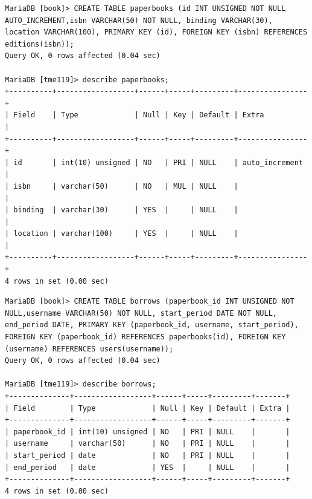 \documentclass{assignment}
\begin{document}
\begin{verbatim}
MariaDB [book]> CREATE TABLE paperbooks (id INT UNSIGNED NOT NULL AUTO_INCREMENT,isbn VARCHAR(50) NOT NULL, binding VARCHAR(30), location VARCHAR(100), PRIMARY KEY (id), FOREIGN KEY (isbn) REFERENCES editions(isbn));
Query OK, 0 rows affected (0.04 sec)

MariaDB [tme119]> describe paperbooks;
+----------+------------------+------+-----+---------+----------------+
| Field    | Type             | Null | Key | Default | Extra          |
+----------+------------------+------+-----+---------+----------------+
| id       | int(10) unsigned | NO   | PRI | NULL    | auto_increment |
| isbn     | varchar(50)      | NO   | MUL | NULL    |                |
| binding  | varchar(30)      | YES  |     | NULL    |                |
| location | varchar(100)     | YES  |     | NULL    |                |
+----------+------------------+------+-----+---------+----------------+
4 rows in set (0.00 sec)
\end{verbatim}

\begin{verbatim}
MariaDB [book]> CREATE TABLE borrows (paperbook_id INT UNSIGNED NOT NULL,username VARCHAR(50) NOT NULL, start_period DATE NOT NULL, end_period DATE, PRIMARY KEY (paperbook_id, username, start_period), FOREIGN KEY (paperbook_id) REFERENCES paperbooks(id), FOREIGN KEY (username) REFERENCES users(username));
Query OK, 0 rows affected (0.04 sec)

MariaDB [tme119]> describe borrows;
+--------------+------------------+------+-----+---------+-------+
| Field        | Type             | Null | Key | Default | Extra |
+--------------+------------------+------+-----+---------+-------+
| paperbook_id | int(10) unsigned | NO   | PRI | NULL    |       |
| username     | varchar(50)      | NO   | PRI | NULL    |       |
| start_period | date             | NO   | PRI | NULL    |       |
| end_period   | date             | YES  |     | NULL    |       |
+--------------+------------------+------+-----+---------+-------+
4 rows in set (0.00 sec)

\end{verbatim}
\end{document}
